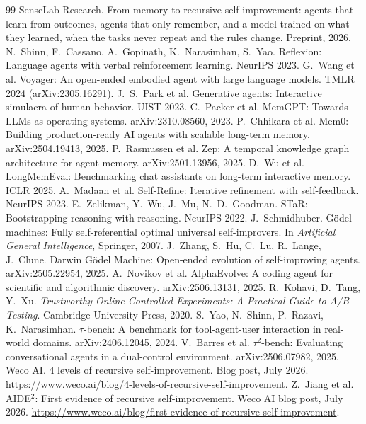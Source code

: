 \documentclass[11pt]{article}
\begin{document}
\begin{thebibliography}{99}\small
{} SenseLab Research. From memory to recursive self-improvement: agents that
learn from outcomes, agents that only remember, and a model trained on what they learned, when
the tasks never repeat and the rules change. Preprint, 2026.
 N.~Shinn, F.~Cassano, A.~Gopinath, K.~Narasimhan, S.~Yao. Reflexion: Language
agents with verbal reinforcement learning. NeurIPS 2023.
 G.~Wang et al. Voyager: An open-ended embodied agent with large language models.
TMLR 2024 (arXiv:2305.16291).
 J.~S.~Park et al. Generative agents: Interactive simulacra of human behavior.
UIST 2023.
 C.~Packer et al. MemGPT: Towards LLMs as operating systems. arXiv:2310.08560, 2023.
 P.~Chhikara et al. Mem0: Building production-ready AI agents with scalable long-term
memory. arXiv:2504.19413, 2025.
 P.~Rasmussen et al. Zep: A temporal knowledge graph architecture for agent memory.
arXiv:2501.13956, 2025.
 D.~Wu et al. LongMemEval: Benchmarking chat assistants on long-term interactive
memory. ICLR 2025.
 A.~Madaan et al. Self-Refine: Iterative refinement with self-feedback.
NeurIPS 2023.
 E.~Zelikman, Y.~Wu, J.~Mu, N.~D.~Goodman. STaR: Bootstrapping reasoning with
reasoning. NeurIPS 2022.
 J.~Schmidhuber. Gödel machines: Fully self-referential optimal universal
self-improvers. In \emph{Artificial General Intelligence}, Springer, 2007.
 J.~Zhang, S.~Hu, C.~Lu, R.~Lange, J.~Clune. Darwin Gödel Machine: Open-ended
evolution of self-improving agents. arXiv:2505.22954, 2025.
 A.~Novikov et al. AlphaEvolve: A coding agent for scientific and algorithmic
discovery. arXiv:2506.13131, 2025.
 R.~Kohavi, D.~Tang, Y.~Xu. \emph{Trustworthy Online Controlled Experiments: A
Practical Guide to A/B Testing}. Cambridge University Press, 2020.
 S.~Yao, N.~Shinn, P.~Razavi, K.~Narasimhan. $\tau$-bench: A benchmark for
tool-agent-user interaction in real-world domains. arXiv:2406.12045, 2024.
 V.~Barres et al. $\tau^2$-bench: Evaluating conversational agents in a
dual-control environment. arXiv:2506.07982, 2025.
 Weco AI. 4 levels of recursive self-improvement. Blog post, July 2026.
\url{https://www.weco.ai/blog/4-levels-of-recursive-self-improvement}.
 Z.~Jiang et al. AIDE$^2$: First evidence of recursive self-improvement. Weco AI
blog post, July 2026. \url{https://www.weco.ai/blog/first-evidence-of-recursive-self-improvement}.
\end{thebibliography}
\end{document}
